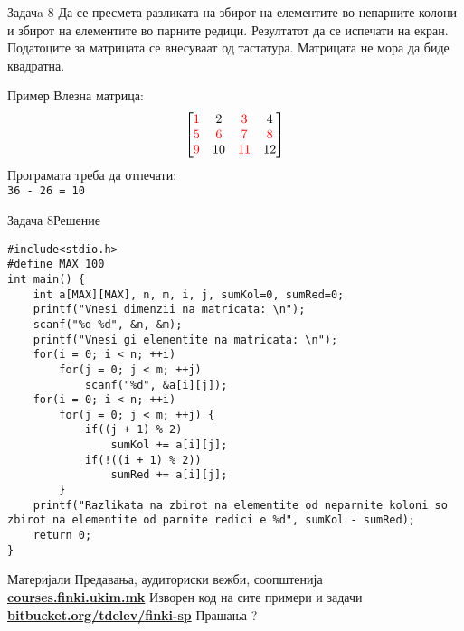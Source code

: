 \begin{frame}{Задачa 8}
Да се пресмета разликата на збирот на елементите во непарните колони и збирот на елементите во парните редици. Резултатот да се испечати на екран. Податоците за матрицата се внесуваат од тастатура. Матрицата не мора да биде квадратна.
\begin{exampleblock}{Пример}
Влезна матрица:\\
$$\begin{bmatrix}
{\color{red}1} & {2} & {\color{red}3} & {4} \\ 
{\color{red}5} & {\color{red}6} & {\color{red}7} & {\color{red}8} \\ 
{\color{red}9} & {10} & {\color{red}11} & {12} 
\end{bmatrix}$$
Програмата треба да отпечати:\\
\texttt{{\color{red}36} - {\color{blue}26} = 10}
\end{exampleblock}
\end{frame}


\begin{frame}[fragile]{Задача 8}{Решение} 
\begin{lstlisting}
#include<stdio.h>
#define MAX 100
int main() {
    int a[MAX][MAX], n, m, i, j, sumKol=0, sumRed=0;
    printf("Vnesi dimenzii na matricata: \n");
    scanf("%d %d", &n, &m);
    printf("Vnesi gi elementite na matricata: \n");
    for(i = 0; i < n; ++i)
        for(j = 0; j < m; ++j)
            scanf("%d", &a[i][j]);
    for(i = 0; i < n; ++i)
        for(j = 0; j < m; ++j) {
            if((j + 1) % 2)
                sumKol += a[i][j];
            if(!((i + 1) % 2))
                sumRed += a[i][j];
        }
    printf("Razlikata na zbirot na elementite od neparnite koloni so zbirot na elementite od parnite redici e %d", sumKol - sumRed);
    return 0;
}
\end{lstlisting}
\end{frame}


\begin{frame}{Материјали}{}
    Предавања, аудиториски вежби, соопштенија\\
    \href{http://courses.finki.ukim.mk/}{\textbf{courses.finki.ukim.mk}}
    \vfill
    Изворен код на сите примери и задачи\\
    \href{http://bitbucket.org/tdelev/finki-sp/}{\textbf{bitbucket.org/tdelev/finki-sp}}
    \vfill
    {\Huge Прашања ?}
\end{frame}